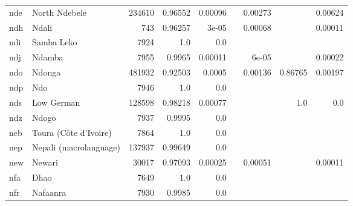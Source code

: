 \documentclass[11pt]{article}
\begin{document}
\begin{table*}[h]
{\begin{tabular}{llrrrrrrr}
nde         & North Ndebele         & 234610         & 0.96552         & 0.00096         &          & 0.00273         &          & 0.00624         \\

ndh         & Ndali         & 743         & 0.96257         & 3e-05         &          & 0.00068         &          & 0.00011         \\

ndi         & Samba Leko         & 7924         & 1.0         & 0.0         &          &          &          &          \\

ndj         & Ndamba         & 7955         & 0.9965         & 0.00011         &          & 6e-05         &          & 0.00022         \\

ndo         & Ndonga         & 481932         & 0.92503         & 0.0005         &          & 0.00136         & 0.86765         & 0.00197         \\

ndp         & Ndo         & 7946         & 1.0         & 0.0         &          &          &          &          \\

nds         & Low German         & 128598         & 0.98218         & 0.00077         &          &          & 1.0         & 0.0         \\

ndz         & Ndogo         & 7937         & 0.9995         & 0.0         &          &          &          &          \\

neb         & Toura (Côte d'Ivoire)         & 7864         & 1.0         & 0.0         &          &          &          &          \\

nep         & Nepali (macrolanguage)         & 137937         & 0.99649         & 0.0         &          &          &          &          \\

new         & Newari         & 30017         & 0.97093         & 0.00025         &          & 0.00051         &          & 0.00011         \\

nfa         & Dhao         & 7649         & 1.0         & 0.0         &          &          &          &          \\

nfr         & Nafaanra         & 7930         & 0.9985         & 0.0         &          &          &          &          \\


\end{tabular}}
\end{table*}
\end{document}
